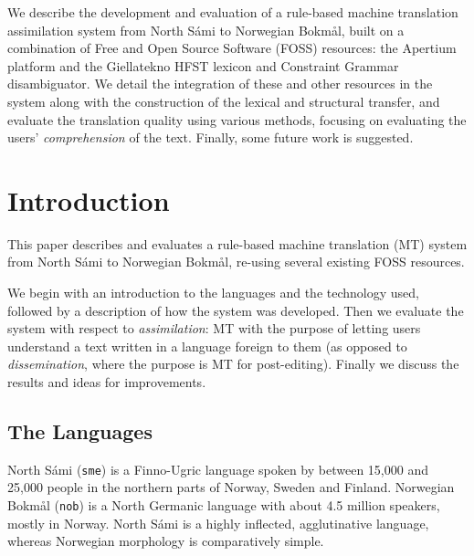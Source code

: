 

\newcommand{\href}[2]{{\tt #1}} %

\newcommand{\sme}{{\tt sme}}
\newcommand{\nob}{{\tt nob}}
\newcommand{\smenob}{\sme$\rightarrow{}$\nob}
\newcommand{\nobsme}{\nob$\rightarrow{}$\sme}




  
We describe the development and evaluation of a rule-based machine
translation assimilation system from North S\'{a}mi to Norwegian
Bokm{\aa}l, built on a combination of Free and Open Source Software
(FOSS) resources: the Apertium platform and the Giellatekno HFST
lexicon and Constraint Grammar disambiguator. We detail the
integration of these and other resources in the system along with the
construction of the lexical and structural transfer, and evaluate the
translation quality using various methods, focusing on evaluating the
users' \textit{comprehension} of the text. Finally, some future work
is suggested.




\section{Introduction} %
This paper describes and evaluates a rule-based machine translation
(MT) system from North S\'{a}mi to Norwegian Bokm{\aa}l, re-using
several existing FOSS resources. 

We begin with an introduction to the languages and the technology
used, followed by a description of how the system was developed. Then
we evaluate the system with respect to \textit{assimilation}: MT with
the purpose of letting users understand a text written in a language
foreign to them (as opposed to \textit{dissemination}, where the
purpose is MT for post-editing). Finally we discuss the results and
ideas for improvements.

\subsection{The Languages}
North S\'{a}mi (\sme{}) is a Finno-Ugric language spoken by between 
15,000 and 25,000 people in the northern parts of Norway, Sweden and
Finland. Norwegian Bokm{\aa}l (\nob{}) is a North Germanic language
with about 4.5 million speakers, mostly in Norway. North S\'{a}mi %
is a highly inflected, agglutinative language, whereas Norwegian
morphology is comparatively simple.

